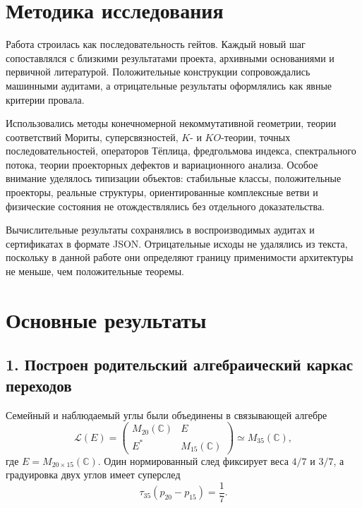 \section*{Методика исследования}

Работа строилась как последовательность гейтов. Каждый новый шаг
сопоставлялся с близкими результатами проекта, архивными основаниями и
первичной литературой. Положительные конструкции сопровождались
машинными аудитами, а отрицательные результаты оформлялись как явные
критерии провала.

Использовались методы конечномерной некоммутативной геометрии, теории
соответствий Мориты, суперсвязностей, $K$- и $KO$-теории, точных
последовательностей, операторов Тёплица, фредгольмова индекса,
спектрального потока, теории проекторных дефектов и вариационного анализа.
Особое внимание уделялось типизации объектов: стабильные классы,
положительные проекторы, реальные структуры, ориентированные комплексные
ветви и физические состояния не отождествлялись без отдельного
доказательства.

Вычислительные результаты сохранялись в воспроизводимых аудитах и
сертификатах в формате JSON. Отрицательные исходы не удалялись из текста,
поскольку в
данной работе они определяют границу применимости архитектуры не меньше,
чем положительные теоремы.

\section*{Основные результаты}

\subsection*{1. Построен родительский алгебраический каркас переходов}

Семейный и наблюдаемый углы были объединены в связывающей алгебре
\begin{equation}
 \mathcal L(E)=
 \begin{pmatrix}
 M_{20}(\mathbb C)&E\\
 E^*&M_{15}(\mathbb C)
 \end{pmatrix}
 \simeq M_{35}(\mathbb C),
\end{equation}
где $E=M_{20\times15}(\mathbb C)$. Один нормированный след фиксирует веса
$4/7$ и $3/7$, а градуировка двух углов имеет суперслед
\begin{equation}
 \tau_{35}(p_{20}-p_{15})=\frac17.
\end{equation}

